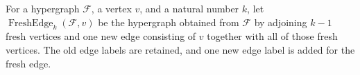 \begin{definition}
For a hypergraph $\mathcal F$, a vertex $v$, and a natural number $k$,
let $\operatorname{FreshEdge}_k(\mathcal F,v)$ be the hypergraph obtained
from $\mathcal F$ by adjoining $k-1$ fresh vertices and one new edge
consisting of $v$ together with all of those fresh vertices.  The old edge
labels are retained, and one new edge label is added for the fresh edge.
\end{definition}
